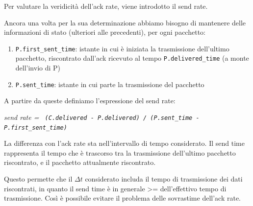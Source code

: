 Per valutare la veridicità dell'ack rate, viene introdotto il send rate. \bigskip

Ancora una volta per la sua determinazione abbiamo bisogno di mantenere delle informazioni di stato (ulteriori alle precedenti), per ogni pacchetto:

\begin{enumerate}

\item \texttt{P.first\_sent\_time}: istante in cui è iniziata la trasmissione dell’ultimo pacchetto, riscontrato dall’ack ricevuto al tempo \texttt{P.delivered\_time} (a monte dell’invio di P) 
\item \texttt{P.sent\_time}: istante in cui parte la trasmissione del pacchetto

\end{enumerate}

A partire da queste definiamo l'espressione del send rate:

\begin{center}
 
\textit{send rate = \texttt{ (C.delivered - P.delivered) / (P.sent\_time - P.first\_sent\_time)}}

\end{center}

La differenza con l'ack rate sta nell'intervallo di tempo considerato. Il send time rappresenta il tempo che è trascorso tra la trasmissione dell'ultimo pacchetto riscontrato, e il pacchetto attualmente riscontrato. \bigskip

Questo permette che il $\Delta t$ considerato includa il tempo di trasmissione dei dati riscontrati, in quanto il send time è in generale >= dell'effettivo tempo di trasmissione. Così è possibile evitare il problema delle sovrastime dell'ack rate. \bigskip

